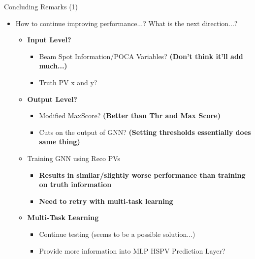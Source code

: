 \documentclass[xcolor=table,aspectratio=169]{beamer}
\begin{document}
\begin{frame}{Concluding Remarks (1)}
    \begin{itemize}
        \item How to continue improving performance...? What is the next direction...?
        \begin{itemize}
            \item \textbf{Input Level?}
            \begin{itemize}
                \item Beam Spot Information/POCA Variables? \textbf{(Don't think it'll add much...)}
                \item Truth PV x and y?
            \end{itemize}
            \item \textbf{Output Level?}
            \begin{itemize}
                \item Modified MaxScore? \textbf{(Better than Thr and Max Score)}
                \item Cuts on the output of GNN? \textbf{(Setting thresholds essentially does same thing)}
            \end{itemize}
            \item Training GNN using Reco PVs
            \begin{itemize}
                \item \textbf{Results in similar/slightly worse performance than training on truth information}
                \item \textbf{Need to retry with multi-task learning}
            \end{itemize}
            \item \textbf{Multi-Task Learning}
            \begin{itemize}
                \item Continue testing (seems to be a possible solution...)
                \item Provide more information into MLP HSPV Prediction Layer?
            \end{itemize}
        \end{itemize}
    \end{itemize}
\end{frame}
\end{document}
